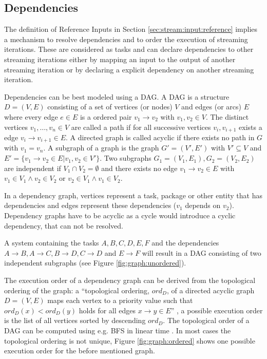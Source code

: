 	\subsection{Dependencies}\label{sec:stream:dependencies}
		The definition of Reference Inputs in Section \ref{sec:stream:input:reference} implies a mechanism to resolve dependencies and to order the execution of streaming iterations. These are considered as tasks and can declare dependencies to other streaming iterations either by mapping an input to the output of another streaming iteration or by declaring a explicit dependency on another streaming iteration.

		Dependencies can be best modeled using a \ac{DAG}. A \ac{DAG} is a structure $D=(V, E)$ consisting of a set of vertices (or nodes) $V$ and edges (or arcs) $E$ where every edge $e\in E$ is a ordered pair $v_1 \rightarrow v_2$ with $v_1, v_2 \in V$. The distinct vertices $v_1,\dots,v_n\in V$ are called a path if for all successive vertices $v_i, v_{i+1}$ exists a edge $v_i \rightarrow v_{i+1} \in E$. A directed graph is called acyclic if there exists no path in $G$ with $v_1 = v_n$. A subgraph of a graph is the graph $G' = (V', E')$ with $V'\subseteq V$ and $E' = \{v_1 \rightarrow v_2 \in E | v_1, v_2\in V'\}$. Two subgraphs $G_1 = (V_1, E_1), G_2 = (V_2, E_2)$ are independent if $V_1 \cap V_2 = \emptyset$ and there exists no edge $v_1\rightarrow v_2\in E$ with $v_1\in V_1 \wedge v_2\in V_2$ or $v_2\in V_1 \wedge v_1\in V_2$.

		In a dependency graph, vertices represent a task, package or other entity that has dependencies and edges represent these dependencies ($v_1$ depends on $v_2$). Dependency graphs have to be acyclic as a cycle would introduce a cyclic dependency, that can not be resolved.

		A system containing the tasks $A, B, C, D, E, F$ and the dependencies $A\rightarrow B, A\rightarrow C, B\rightarrow D, C\rightarrow D$ and $E\rightarrow F$ will result in a \ac{DAG} consisting of two independent subgraphs (see Figure \ref{fig:graph:unordered}).

		The execution order of a dependency graph can be derived from the topological ordering of the graph: a ``topological ordering, $ord_D$, of a directed acyclic graph $D = (V, E)$ maps each vertex to a priority value such that $ord_{D}(x) < ord_{D}(y)$ holds for all edges $x \rightarrow y \in E$'' \citep{pearce2007dynamic}, a possible execution order is the list of all vertices sorted by descending $ord_D$. The topological order of a \ac{DAG} can be computed using e.g. \ac{BFS} in linear time \citep{cormen2001introduction}. In most cases the topological ordering is not unique, Figure \ref{fig:graph:ordered} shows one possible execution order for the before mentioned graph.

